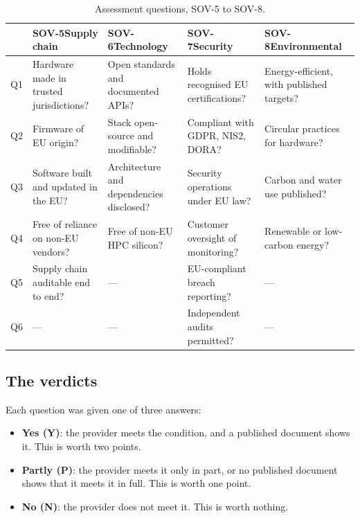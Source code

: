 \begin{table}[htbp]
  \centering
  \caption{Assessment questions, SOV-5 to SOV-8.}
  \label{tab:sov-questions-b}
  \footnotesize
  \renewcommand{\arraystretch}{1.2}
  \begin{tabularx}{\textwidth}{@{}c X X X X@{}}
    \toprule
    & \textbf{SOV-5}\newline Supply chain
    & \textbf{SOV-6}\newline Technology
    & \textbf{SOV-7}\newline Security
    & \textbf{SOV-8}\newline Environmental \\
    \midrule
    Q1 & Hardware made in trusted jurisdictions?
       & Open standards and documented \acsp{API}?
       & Holds recognised \acs{EU} certifications?
       & Energy-efficient, with published targets? \\
    Q2 & Firmware of \acs{EU} origin?
       & Stack open-source and modifiable?
       & Compliant with \acs{GDPR}, \acs{NIS2}, \acs{DORA}?
       & Circular practices for hardware? \\
    Q3 & Software built and updated in the \acs{EU}?
       & Architecture and dependencies disclosed?
       & Security operations under \acs{EU} law?
       & Carbon and water use published? \\
    Q4 & Free of reliance on non-\acs{EU} vendors?
       & Free of non-\acs{EU} \acs{HPC} silicon?
       & Customer oversight of monitoring?
       & Renewable or low-carbon energy? \\
    Q5 & Supply chain auditable end to end?
       & ---
       & \acs{EU}-compliant breach reporting?
       & --- \\
    Q6 & ---
       & ---
       & Independent audits permitted?
       & --- \\
    \bottomrule
  \end{tabularx}
\end{table}

\subsection*{The verdicts}

Each question was given one of three answers:

\begin{itemize}
  \item \textbf{Yes (Y)}: the provider meets the condition, and a published document
        shows it. This is worth two points.
  \item \textbf{Partly (P)}: the provider meets it only in part, or no published
        document shows that it meets it in full. This is worth one point.
  \item \textbf{No (N)}: the provider does not meet it. This is worth nothing.
\end{itemize}

